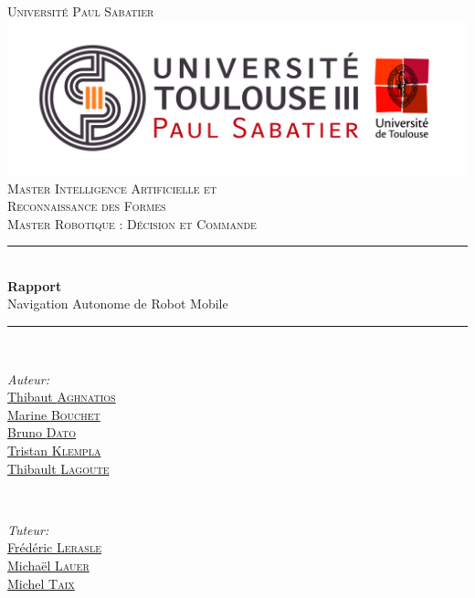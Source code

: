 \documentclass[10pt,a4paper]{article}
\begin{document}
\pagestyle {plain}

\begin{titlepage}


\newcommand{\HRule}{\rule{\linewidth}{0.5mm}} 

\center

\textsc{\Large Université Paul Sabatier}\\[1cm] 
\includegraphics[scale=0.3]{figures/UPS.jpg}\\[0.6cm] 


\textsc{Master Intelligence Artificielle et \\ 
Reconnaissance des Formes \\ Master Robotique : Décision et Commande}\\[3cm] 

\HRule \\[0.4cm]
{ \huge \bfseries Rapport}\\[0.4cm] 
\LARGE Navigation Autonome de Robot Mobile

\HRule \\[1.5cm]
 

\begin{minipage}{0.4\textwidth}
\begin{flushleft} \large
\emph{Auteur:}\\
\href{mailto:thibaut.aghnatios@laposte.net}{Thibaut \textsc{Aghnatios} }  \\
\href{mailto:bouchetmarinee@gmail.com}{Marine \textsc{Bouchet} } \\
\href{mailto:bruno.dato.meneses@gmail.com}{Bruno \textsc{Dato} } \\
\href{mailto:klempka.tristan@gmail.com}{Tristan \textsc{Klempla} } \\
\href{mailto:lagoute.31@gmail.com}{Thibault \textsc{Lagoute} }  
\end{flushleft}
\end{minipage}
~
\begin{minipage}{0.4\textwidth}
\begin{flushright} \large
\emph{Tuteur:} \\
\href{mailto:lerasle@laas.fr}{Frédéric \textsc{Lerasle}}\\
\href{mailto:michael.lauer@laas.fr}{Michaël \textsc{Lauer}} \\
\href{mailto:taix@laas.f}{Michel \textsc{Taix}}
\end{flushright}
\end{minipage}\\[5cm]


\end{titlepage}
\end{document}
